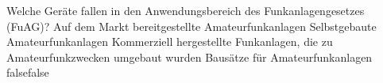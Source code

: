     {Welche Geräte fallen in den Anwendungsbereich des Funkanlagengesetzes (FuAG)?}
    {Auf dem Markt bereitgestellte Amateurfunkanlagen}
    {Selbstgebaute Amateurfunkanlagen}
    {Kommerziell hergestellte Funkanlagen, die zu Amateurfunkzwecken umgebaut wurden}
    {Bausätze für Amateurfunkanlagen}
    {false}{false}